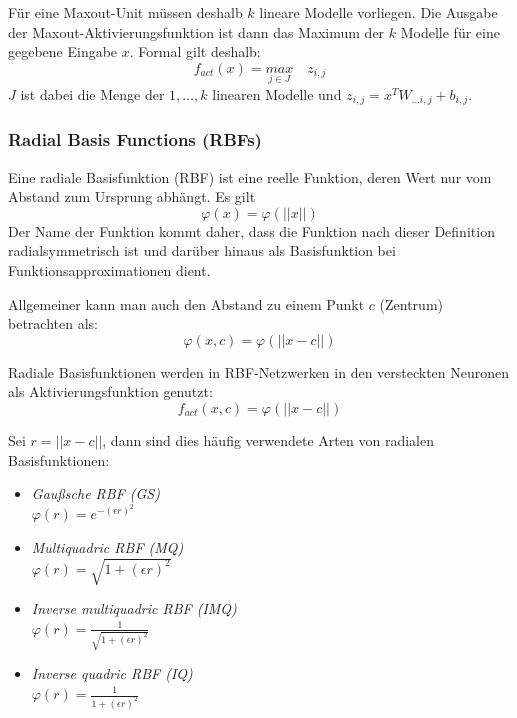 Für eine Maxout-Unit müssen deshalb $k$ lineare Modelle vorliegen. Die Ausgabe der Maxout-Aktivierungsfunktion ist dann das Maximum der $k$ Modelle für eine gegebene Eingabe $x$. Formal gilt deshalb:
\[
	f_{act}(x) = \underset{j \in J}{max} \quad z_{i,j}
\]
$J$ ist dabei die Menge der $1, \ldots, k$ linearen Modelle und $z_{i,j} = x^T W_{\ldots i,j} + b_{i,j}$.

\subsubsection*{Radial Basis Functions (RBFs)}
Eine radiale Basisfunktion (RBF) ist eine reelle Funktion, deren Wert nur vom Abstand zum Ursprung abhängt. Es gilt
\[
	\varphi(x) = \varphi(||x||)
\]
Der Name der Funktion kommt daher, dass die Funktion nach dieser Definition radialsymmetrisch ist und darüber hinaus als Basisfunktion bei Funktionsapproximationen dient.

Allgemeiner kann man auch den Abstand zu einem Punkt $c$ (Zentrum) betrachten als:
\[
	\varphi(x,c) = \varphi(||x - c||)
\]

Radiale Basisfunktionen werden in RBF-Netzwerken in den versteckten Neuronen als Aktivierungsfunktion genutzt:
\[
	f_{act}(x,c) = \varphi( ||x - c||)
\]

Sei $r=||x - c||$, dann sind dies häufig verwendete Arten von radialen Basisfunktionen:
\begin{itemize}
	\item \emph{Gaußsche RBF (GS)} \\
	$\varphi(r) = e^{-(\epsilon r)^2}$
	\item \emph{Multiquadric RBF (MQ)} \\
	$\varphi(r) = \sqrt{1 + (\epsilon r)^2}$
	\item \emph{Inverse multiquadric RBF (IMQ)} \\
	$\varphi(r) = \frac{1}{\sqrt{1 + (\epsilon r)^2}}$
	\item \emph{Inverse quadric RBF (IQ)} \\
	$\varphi(r) = \frac{1}{1 + (\epsilon r)^2}$ 
\end{itemize}


